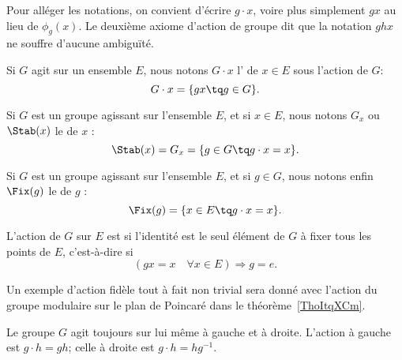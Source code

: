 Pour alléger les notations, on convient d'écrire $g \cdot x$, voire plus simplement $gx$ au lieu de \( \phi_g(x) \). Le deuxième axiome d'action de groupe dit que la notation $ghx$ ne souffre d'aucune ambiguïté.

\begin{definition}[Orbite]
	Si \( G\) agit sur un ensemble \( E\), nous notons \( G\cdot x\) l' de \( x\in E\) sous l'action de $G$:
	\begin{equation*}
		G\cdot x = \{ gx \tq g \in G\}.
	\end{equation*}
\end{definition}

\begin{definition}[Stabilisateur]       \label{DEFooMDYGooLrOERP}
	Si \( G\) est un groupe agissant sur l'ensemble \( E\), et si \( x\in E\), nous notons \( G_x\) ou \( \Stab(x)\) le  de \( x\) :
	\begin{equation}
		\Stab(x)=G_x=\{ g\in G\tq g\cdot x=x \}.
	\end{equation}
\end{definition}

\begin{definition}[Fixateur]
	Si \( G\) est un groupe agissant sur l'ensemble \( E\), et si \( g\in G\), nous notons enfin \( \Fix(g)\) le  de \( g\) :
	\begin{equation}
		\Fix(g)=\{ x\in E\tq g\cdot x=x \}.
	\end{equation}
\end{definition}

\begin{definition}  \label{DefuyYJRh}
	L'action de \( G\) sur \( E\) est  si l'identité est le seul élément de \( G\) à fixer tous les points de \( E\), c'est-à-dire si 
    \begin{equation}
     (gx=x\quad \forall x\in E)\Rightarrow g=e.
    \end{equation}
\end{definition}

Un exemple d'action fidèle tout à fait non trivial sera donné avec l'action du groupe modulaire sur le plan de Poincaré dans le théorème~\ref{ThoItqXCm}.

Le groupe \( G\) agit toujours sur lui même à gauche et à droite. L'action à gauche est \( g\cdot h=gh\); celle à droite est \( g\cdot h=hg^{-1}\).

